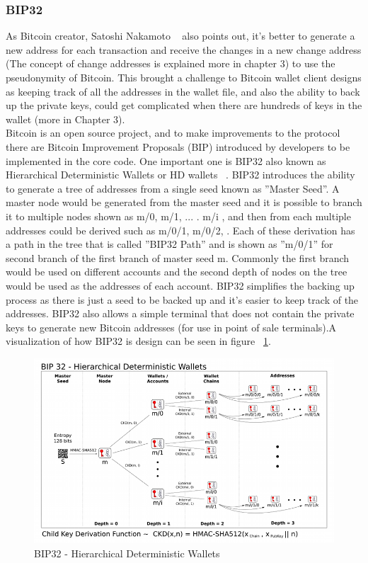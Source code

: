 \subsubsection{BIP32} \label{BIP32}
As Bitcoin creator, Satoshi Nakamoto ~\cite{Nak08} also points out, it's better to generate a new address for each transaction and receive the changes in a new change address (The concept of change addresses is explained more in chapter 3) to use the pseudonymity of Bitcoin. This brought a challenge to Bitcoin wallet client designs as keeping track of all the addresses in the wallet file, and also the ability to back up the private keys, could get complicated when there are hundreds of keys in the wallet (more in Chapter 3). \\
Bitcoin is an open source project, and to make improvements to the protocol there are Bitcoin Improvement Proposals (BIP) introduced by developers to be implemented in the core code. One important one is BIP32 also known as Hierarchical Deterministic Wallets or HD wallets ~\cite{bip32}. BIP32 introduces the ability to generate a tree of addresses from a single seed known as ''Master Seed''. A master node would be generated from the master seed and it is possible to branch it to multiple nodes shown as m/0, m/1, ... . m/i , and then from each multiple addresses could be derived such as m/0/1, m/0/2, \etc. Each of these derivation has a path in the tree that is called ''BIP32 Path'' and is shown as ''m/0/1'' for second branch of the first branch of master seed m. Commonly the first branch would be used on different accounts and the second depth of nodes on the tree would be used as the addresses of each account. BIP32 simplifies the backing up process as there is just a seed to be backed up and it's easier to keep track of the addresses. BIP32 also allows a simple terminal that does not contain the private keys to generate new Bitcoin addresses (for use in point of sale terminals).A visualization of how BIP32 is design can be seen in figure ~\ref{fig:bip32}.

\begin{figure}
\centering
\includegraphics[width=\linewidth]{fig/bip32derivation.png}
  \caption{BIP32 - Hierarchical Deterministic Wallets ~\cite{bip32proposal}}
\label{fig:bip32}
\end{figure}


